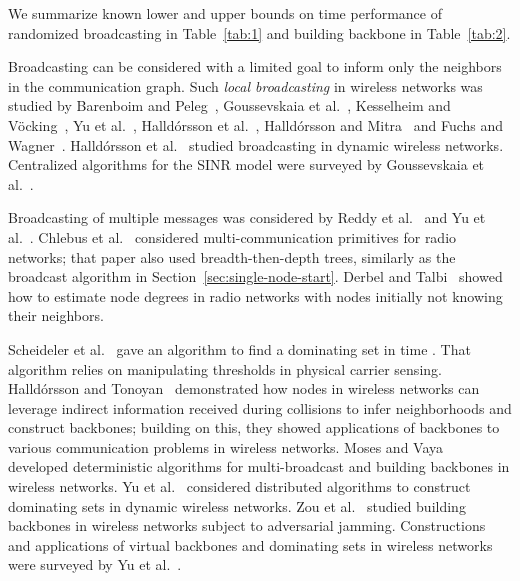 \documentclass[11pt]{article}
\begin{document}
We summarize known lower and upper bounds on time performance of randomized broadcasting in Table~\ref{tab:1} and building backbone in Table~\ref{tab:2}.




Broadcasting can be considered with a limited goal to inform only the neighbors in the communication graph.
Such \emph{local broadcasting} in wireless networks was studied by Barenboim and Peleg~\cite{BarenboimP15},  Goussevskaia et al.~\cite{GoussevskaiaMW08}, Kesselheim and V{\"o}cking~\cite{KV10}, Yu et al.~\cite{YuWHL11},  Halld{\'o}rsson et al.~\cite{HalldorssonHL15}, Halld{\'o}rsson and Mitra~\cite{HalldorssonM12} and  Fuchs and Wagner~\cite{FuchsW13}.
Halld{\'o}rsson et al.~\cite{HalldorssonTWY16} studied broadcasting in dynamic wireless networks.
Centralized algorithms for the SINR model were surveyed by Goussevskaia et al.~\cite{GoussevskaiaPW10-survey}. 

Broadcasting of multiple messages was considered by Reddy et al.~\cite{ReddyKV15,ReddyV16} and Yu et al.~\cite{YuHWTL-SIROCCO12,YuHWYL-INFOCOM13}.
Chlebus et al.~\cite{ChlebusKPR-ICALP11} considered multi-communication primitives for radio networks; that paper also used breadth-then-depth trees, similarly as the broadcast algorithm in Section~\ref{sec:single-node-start}.
Derbel and Talbi~\cite{DerbelT10} showed how to estimate node degrees in radio networks with nodes initially not knowing their neighbors.

Scheideler et al.~\cite{ScheidelerRS08} gave an algorithm to find a dominating set in time .
That algorithm relies on manipulating thresholds in physical carrier sensing.
Halld{\'{o}}rsson and Tonoyan~\cite{HalldorssonT21} demonstrated how nodes in wireless networks can leverage indirect information received during collisions to infer neighborhoods  and construct backbones; building on this, they showed applications of backbones to various communication problems in wireless networks. 
Moses and Vaya~\cite{MosesV21} developed deterministic algorithms for multi-broadcast and building backbones in wireless networks.
Yu et al.~\cite{YuZ0LY0C019} considered distributed algorithms to construct dominating sets in dynamic wireless networks.
Zou et al.~\cite{ZouYWYWH019} studied building backbones in wireless networks subject to adversarial jamming.
Constructions and applications of virtual backbones and dominating sets in wireless networks were surveyed by Yu et al.~\cite{YuWWY2013}.
\end{document}
